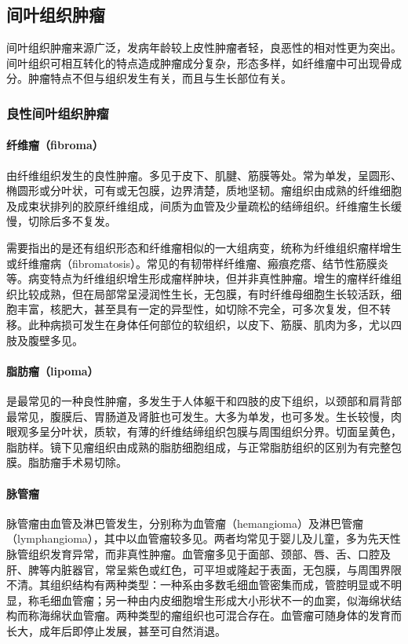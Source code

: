 \subsection{间叶组织肿瘤}

间叶组织肿瘤来源广泛，发病年龄较上皮性肿瘤者轻，良恶性的相对性更为突出。间叶组织可相互转化的特点造成肿瘤成分复杂，形态多样，如纤维瘤中可出现骨成分。肿瘤特点不但与组织发生有关，而且与生长部位有关。

\subsubsection{良性间叶组织肿瘤}

\paragraph{纤维瘤（fibroma）}
由纤维组织发生的良性肿瘤。多见于皮下、肌腱、筋膜等处。常为单发，呈圆形、椭圆形或分叶状，可有或无包膜，边界清楚，质地坚韧。瘤组织由成熟的纤维细胞及成束状排列的胶原纤维组成，间质为血管及少量疏松的结缔组织。纤维瘤生长缓慢，切除后多不复发。

需要指出的是还有组织形态和纤维瘤相似的一大组病变，统称为纤维组织瘤样增生或纤维瘤病（fibromatosis）。常见的有韧带样纤维瘤、瘢痕疙瘩、结节性筋膜炎等。病变特点为纤维组织增生形成瘤样肿块，但并非真性肿瘤。增生的瘤样纤维组织比较成熟，但在局部常呈浸润性生长，无包膜，有时纤维母细胞生长较活跃，细胞丰富，核肥大，甚至具有一定的异型性，如切除不完全，可多次复发，但不转移。此种病损可发生在身体任何部位的软组织，以皮下、筋膜、肌肉为多，尤以四肢及腹壁多见。

\paragraph{脂肪瘤（lipoma）}
是最常见的一种良性肿瘤，多发生于人体躯干和四肢的皮下组织，以颈部和肩背部最常见，腹膜后、胃肠道及肾脏也可发生。大多为单发，也可多发。生长较慢，肉眼观多呈分叶状，质软，有薄的纤维结缔组织包膜与周围组织分界。切面呈黄色，脂肪样。镜下见瘤组织由成熟的脂肪细胞组成，与正常脂肪组织的区别为有完整包膜。脂肪瘤手术易切除。

\paragraph{脉管瘤}
脉管瘤由血管及淋巴管发生，分别称为血管瘤（hemangioma）及淋巴管瘤（lymphangioma），其中以血管瘤较多见。两者均常见于婴儿及儿童，多为先天性脉管组织发育异常，而非真性肿瘤。血管瘤多见于面部、颈部、唇、舌、口腔及肝、脾等内脏器官，常呈紫色或红色，可平坦或隆起于表面，无包膜，与周围界限不清。其组织结构有两种类型：一种系由多数毛细血管密集而成，管腔明显或不明显，称毛细血管瘤；另一种由内皮细胞增生形成大小形状不一的血窦，似海绵状结构而称海绵状血管瘤。两种类型的瘤组织也可混合存在。血管瘤可随身体的发育而长大，成年后即停止发展，甚至可自然消退。

